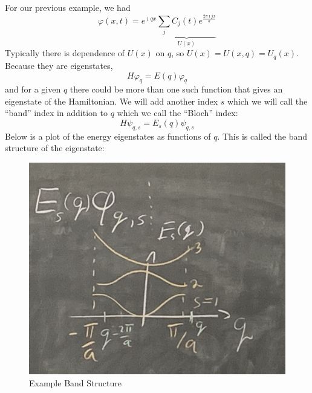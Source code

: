 \documentclass[a4paper,twoside,master.tex]{subfiles}
\begin{document}
For our previous example, we had
\begin{equation}
    \varphi(x, t) = e^{\imath q x} \underbrace{\sum_j C_j(t) e^{\frac{2 \pi \imath jx}{a}}}_{U(x)}
\end{equation}
Typically there is dependence of $ U(x) $ on $ q $, so $ U(x) = U(x,q) = U_q(x) $. Because they are eigenstates,
\begin{equation}
    H \varphi_q = E(q) \varphi_q
\end{equation}
and for a given $ q $ there could be more than one such function that gives an eigenstate of the Hamiltonian. We will add another index $ s $ which we will call the ``band'' index in addition to $ q $ which we call the ``Bloch'' index:
\begin{equation}
    H \psi_{q,s} = E_s(q) \psi_{q,s}
\end{equation}
Below is a plot of the energy eigenstates as functions of $ q $. This is called the band structure of the eigenstate:
\begin{figure}[h]
    \centering
    \includegraphics[width=\textwidth/2]{figures/lec_31_band.jpg}
    \caption{Example Band Structure}
    \label{fig:example_band_structure}
\end{figure}
\end{document}
